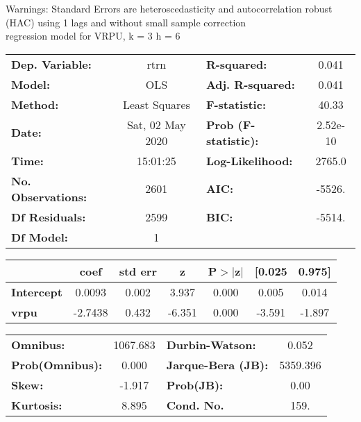 Warnings: \newline
 [1] Standard Errors are heteroscedasticity and autocorrelation robust (HAC) using 1 lags and without small sample correction\\ 

regression model for VRPU, k = 3 h = 6\begin{center}
\begin{tabular}{lclc}
\toprule
\textbf{Dep. Variable:}    &       rtrn       & \textbf{  R-squared:         } &     0.041   \\
\textbf{Model:}            &       OLS        & \textbf{  Adj. R-squared:    } &     0.041   \\
\textbf{Method:}           &  Least Squares   & \textbf{  F-statistic:       } &     40.33   \\
\textbf{Date:}             & Sat, 02 May 2020 & \textbf{  Prob (F-statistic):} &  2.52e-10   \\
\textbf{Time:}             &     15:01:25     & \textbf{  Log-Likelihood:    } &    2765.0   \\
\textbf{No. Observations:} &        2601      & \textbf{  AIC:               } &    -5526.   \\
\textbf{Df Residuals:}     &        2599      & \textbf{  BIC:               } &    -5514.   \\
\textbf{Df Model:}         &           1      & \textbf{                     } &             \\
\bottomrule
\end{tabular}
\begin{tabular}{lcccccc}
                   & \textbf{coef} & \textbf{std err} & \textbf{z} & \textbf{P$> |$z$|$} & \textbf{[0.025} & \textbf{0.975]}  \\
\midrule
\textbf{Intercept} &       0.0093  &        0.002     &     3.937  &         0.000        &        0.005    &        0.014     \\
\textbf{vrpu}      &      -2.7438  &        0.432     &    -6.351  &         0.000        &       -3.591    &       -1.897     \\
\bottomrule
\end{tabular}
\begin{tabular}{lclc}
\textbf{Omnibus:}       & 1067.683 & \textbf{  Durbin-Watson:     } &    0.052  \\
\textbf{Prob(Omnibus):} &   0.000  & \textbf{  Jarque-Bera (JB):  } & 5359.396  \\
\textbf{Skew:}          &  -1.917  & \textbf{  Prob(JB):          } &     0.00  \\
\textbf{Kurtosis:}      &   8.895  & \textbf{  Cond. No.          } &     159.  \\
\bottomrule
\end{tabular}
\end{center}


